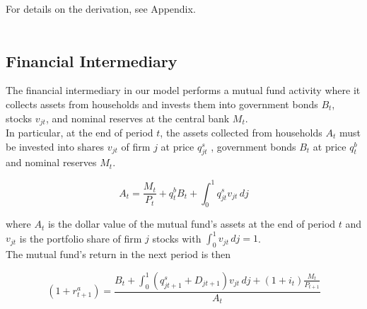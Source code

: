 \documentclass[titlepage]{\econtex}\providecommand{\texname}{BufferStockTheory}
\begin{document}
For details on the derivation, see Appendix.\\ \\


\begin{comment}
Combining the transition equations, the recursive nature of
the problem allows us to rewrite it more compactly in Bellman equation form,
\begin{eqnarray*}
\VFunc_{t}(\mLevBF_{t},\pLevBF_{t}) & = & \max_{\cLevBF_{t}}~\left\{\util(\cLevBF_{t})+\DiscFac \Ex_{t}\left[ \VFunc_{t+1}((\mLevBF_{t}-\cLevBF_{t})\Rfree+ \pLevBF_{t+1}\tShkAll_{t+1},\pLevBF_{t} \PGro  \pShk_{t+1})\right]\right\}
.
\end{eqnarray*}
\end{comment} 

\hypertarget{Financial Intermediary}{}
\subsection{Financial Intermediary}

\label{subsec:Financial Intermediary}

The financial intermediary in our model performs a mutual fund activity where it  collects assets from households and invests them into government bonds $B_{t}$, stocks $v_{jt}$, and nominal reserves at the central bank $M_{t}$.\\ 

In particular, at the end of period $t$, the assets collected from households $A_{t}$ must be invested into shares $\mathit{v}_{jt}$ of firm $j$ at price  $q^{s}_{jt}$ , government bonds $B_{t}$ at price $q^{b}_{t}$ and nominal reserves $M_{t}$. 

\begin{equation} A_{t} = \frac{M_{t}}{P_{t}} +q^{b}_{t} B_{t} + \int_{0}^{1} q^{s}_{jt}\mathit{v}_{jt}\,dj \end{equation}

where $A_{t} $ is the dollar value of the mutual fund's assets at the end of period $t$ and $ \mathit{v}_{jt}$ is the portfolio share of firm $j$ stocks with $\int_{0}^{1} \mathit{v}_{jt}\,dj =1$.  \\

The mutual fund's return in the next period is then 

$$(1+r^{a}_{t+1})  = \frac{  B_{t} + \int_{0}^{1} (q^{s}_{jt+1}+ D_{jt+1})\mathit{v}_{jt} \, dj +(1+i_{t}) \frac{M_{t}}{P_{t+1}}}{A_{t}}$$\\ 
\end{document}
